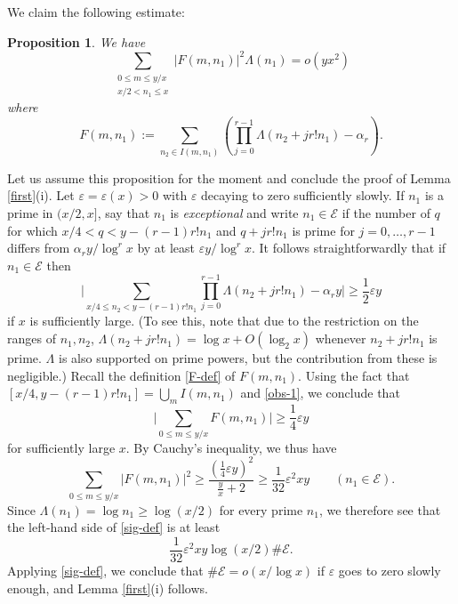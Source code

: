 \documentclass[12pt]{amsart}
\numberwithin{equation}{section}  %
\theoremstyle{remark}
\theoremstyle{plain}
\newtheorem{prop}{Proposition}
\numberwithin{equation}{section}
\newcommand{\eps}{\ensuremath{\varepsilon}}
\renewcommand{\le}{\leqslant}
\renewcommand{\leq}{\leqslant}
\renewcommand{\ge}{\geqslant}
\renewcommand{\geq}{\geqslant}
\renewcommand{\(}{\left(}
\renewcommand{\)}{\right)}
\begin{document}
We claim the following estimate:

\begin{prop}\label{sigma-prop}  We have
\begin{equation}\label{sig-def} 
\sum_{\substack{0 \leq m \leq y/x \\x/2 < n_1 \le x}} |F(m,n_1)|^2 \Lambda(n_1) = o(y x^2 )
\end{equation}
where
\begin{equation}\label{F-def} F(m,n_1) := \sum_{n_2 \in I(m,n_1)} \left(\prod_{j = 0}^{r-1} \Lambda(n_2 + jr! n_1) - \alpha_r\right).\end{equation}
\end{prop}

Let us assume this proposition for the moment and conclude the proof of Lemma \ref{first}(i).
Let $\eps=\eps(x)>0$ with $\eps$ decaying to zero sufficiently slowly.
If $n_1$ is a prime in $(x/2,x]$, say that $n_1$ is \emph{exceptional}
and write $n_1 \in \mathscr{E}$ if the number of $q$ for which $x/4 < q  < y - (r-1) r! n_1$ and $q + jr! n_1$ is prime for $j = 0,\dots, r-1$ differs from $\alpha_r y/\log^r x$ by at least $\eps y/\log^r x$. It follows straightforwardly
that if $n_1 \in \mathscr{E}$ then
\[ \Bigg| \sum_{x/4 \leq n_2 < y - (r-1) r! n_1} \prod_{j =
  0}^{r-1}\Lambda(n_2 + jr! n_1)  - \alpha_r y\Bigg| \geq
\frac{1}{2}\eps y\] if $x$ is sufficiently large. (To see
this, note that due to the restriction on the ranges of $n_1,n_2$,
$\Lambda(n_2 + j r! n_1) = \log x+O(\log_2 x)$ whenever $n_2 + jr!
n_1$ is prime. $\Lambda$ is also supported on prime powers, but the
contribution from these is negligible.)
Recall the definition \eqref{F-def} of $F(m,n_1)$.  Using
the fact that $[x/4, y - (r-1)r! n_1] = \bigcup_m I(m,n_1)$ and
\eqref{obs-1},
we conclude that
\[
\Bigg| \sum_{0\le m\le y/x} F(m,n_1) \Bigg| \ge \frac14 \eps y
\]
for sufficiently large $x$.  By Cauchy's inequality, we thus have
\[
 \sum_{0\le m\le y/x} |F(m,n_1)|^2 \ge \frac{\(\frac14 \eps
   y\)^2}{\frac{y}{x}+2}\ge \frac1{32} \eps^2 xy \qquad (n_1 \in  \mathscr{E}).
\]
Since $\Lambda(n_1) = \log n_1 \ge \log (x/2)$ for every prime $n_1$, we therefore see that the left-hand side of \eqref{sig-def} is at least
\[
\frac1{32} \eps^2 xy \log(x/2) \# \mathscr{E}.
\]
Applying \eqref{sig-def}, we conclude that $\# \mathscr{E}=o(x/\log x)$ if
$\eps$ goes to zero slowly enough, and Lemma \ref{first}(i) follows.
\end{document}
